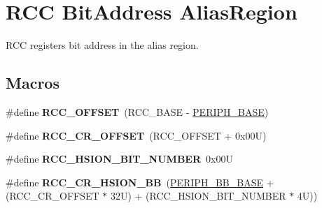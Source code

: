 \hypertarget{group___r_c_c___bit_address___alias_region}{}\section{R\+CC Bit\+Address Alias\+Region}
\label{group___r_c_c___bit_address___alias_region}


R\+CC registers bit address in the alias region.  


\subsection*{Macros}
\begin{DoxyCompactItemize}
\item 
\mbox{\label{group___r_c_c___bit_address___alias_region_ga539e07c3b3c55f1f1d47231341fb11e1}} 
\#define {\bfseries R\+C\+C\+\_\+\+O\+F\+F\+S\+ET}~(R\+C\+C\+\_\+\+B\+A\+SE -\/ \mbox{\hyperlink{group___peripheral__memory__map_ga9171f49478fa86d932f89e78e73b88b0}{P\+E\+R\+I\+P\+H\+\_\+\+B\+A\+SE}})
\item 
\mbox{\label{group___r_c_c___bit_address___alias_region_ga6df8d81c05c07cb0c26bbf27ea7fe55c}} 
\#define {\bfseries R\+C\+C\+\_\+\+C\+R\+\_\+\+O\+F\+F\+S\+ET}~(R\+C\+C\+\_\+\+O\+F\+F\+S\+ET + 0x00\+U)
\item 
\mbox{\label{group___r_c_c___bit_address___alias_region_ga9bf60daa74224ea82d3df7e08d4533f1}} 
\#define {\bfseries R\+C\+C\+\_\+\+H\+S\+I\+O\+N\+\_\+\+B\+I\+T\+\_\+\+N\+U\+M\+B\+ER}~0x00U
\item 
\mbox{\label{group___r_c_c___bit_address___alias_region_gabd3eca3cc8b1501f9d8a62c4a0ebcfe7}} 
\#define {\bfseries R\+C\+C\+\_\+\+C\+R\+\_\+\+H\+S\+I\+O\+N\+\_\+\+BB}~(\mbox{\hyperlink{group___peripheral__memory__map_gaed7efc100877000845c236ccdc9e144a}{P\+E\+R\+I\+P\+H\+\_\+\+B\+B\+\_\+\+B\+A\+SE}} + (R\+C\+C\+\_\+\+C\+R\+\_\+\+O\+F\+F\+S\+ET $\ast$ 32\+U) + (\+R\+C\+C\+\_\+\+H\+S\+I\+O\+N\+\_\+\+B\+I\+T\+\_\+\+N\+U\+M\+B\+E\+R $\ast$ 4\+U))
\item 
\mbox{\label{group___r_c_c___bit_address___alias_region_gaa8a1695db870d271a9e79bf0272ec8b6}} 

\end{DoxyCompactItemize}
